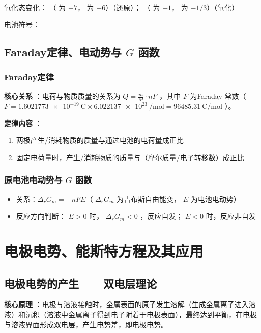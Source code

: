 氧化态变化：  （   为 \(+ 7\)，   为 \(+ 6\)）（还原）；  （   为 \(- 1\)，   为 \(- 1/3\)）（氧化）

电池符号：  

\subsection{Faraday定律、电动势与 $G$ 函数} 

\subsubsection{Faraday定律} 
\textbf{核心关系} ：电荷与物质质量的关系为 $ Q = \frac{m}{M}  \cdot nF $ ，其中 $ F $ 为Faraday 常数（ $ F = \num{1.6021773e-19} ~\si{\coulomb}  \times \num{6.022137e23} ~\si{\per\mol}  = \qty{96485.31}{\coulomb\per\mol}  $ ）。

\textbf{定律内容} ：
\begin{enumerate} 
    \item 两极产生/消耗物质的质量与通过电池的电荷量成正比
    \item 固定电荷量时，产生/消耗物质的质量与（摩尔质量/电子转移数）成正比
\end{enumerate} 

\subsubsection{原电池电动势与 $G$ 函数} 
\begin{itemize} 
    \item 关系：\(\Delta_r G_m = -n F E\)（ $ \Delta_r G_m $ 为吉布斯自由能变， $ E $ 为电池电动势）
    \item 反应方向判断： $ E > 0 $ 时， $ \Delta_r G_m < 0 $ ，反应自发； $ E < 0 $ 时，反应非自发
\end{itemize} 

\section{电极电势、能斯特方程及其应用} 

\subsection{电极电势的产生——双电层理论} 
\textbf{核心原理} ：电极与溶液接触时，金属表面的原子发生溶解（生成金属离子进入溶液）和沉积（溶液中金属离子得到电子附着于电极表面），最终达到平衡，在电极与溶液界面形成双电层，产生电势差，即电极电势。

